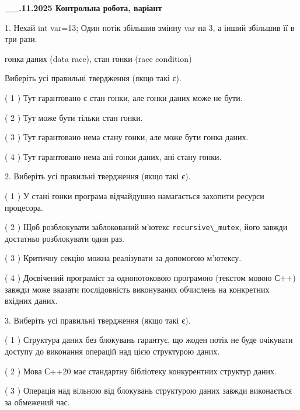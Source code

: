\documentclass[12pt, ukrainian]{article}
\def\code#1{\Verb!#1!}
\begin{document}
\newpage
\begin {large}

\textbf{\_\_.11.2025 Контрольна робота, варіант  }\par


{
1. Нехай int var=13; Один потік збільшив змінну var на 3, а інший збільшив її в три рази.

гонка даних (data race), стан гонки (race condition)

Виберіть усі правильні твердження (якщо такі є).\par
\vspace{2mm}
( 1 ) Тут гарантовано є стан гонки, але гонки даних може не бути.%

( 2 ) Тут може бути тільки стан гонки.%

( 3 ) Тут гарантовано нема стану гонки, але може бути гонка даних.%

( 4 ) Тут гарантовано нема ані гонки даних, ані стану гонки.%


2. Виберіть усі правильні твердження (якщо такі є).\par
\vspace{2mm}

( 1 ) У стані гонки програма відчайдушно намагається захопити ресурси процесора.%

( 2 ) Щоб розблокувати заблокований м’ютекс \code{recursive\_mutex}, його завжди достатньо розблокувати один раз.%

( 3 ) Критичну секцію можна реалізувати за допомогою м’ютексу.%

( 4 ) Досвічений програміст за однопотоковою програмою (текстом мовою С++) завжди може вказати послідовність виконуваних обчислень на конкретних вхідних даних.%


3. Виберіть усі правильні твердження (якщо такі є).\par
\vspace{2mm}

( 1 ) Структура даних без блокувань гарантує, що жоден потік не буде очікувати доступу до виконання операцій над цією структурою даних.%

( 2 ) Мова С++20 має стандартну бібліотеку конкурентних структур даних.%

( 3 ) Операція над вільною від блокувань структурою даних завжди виконається за обмежений час.%

}
\end{large}
\end{document}
